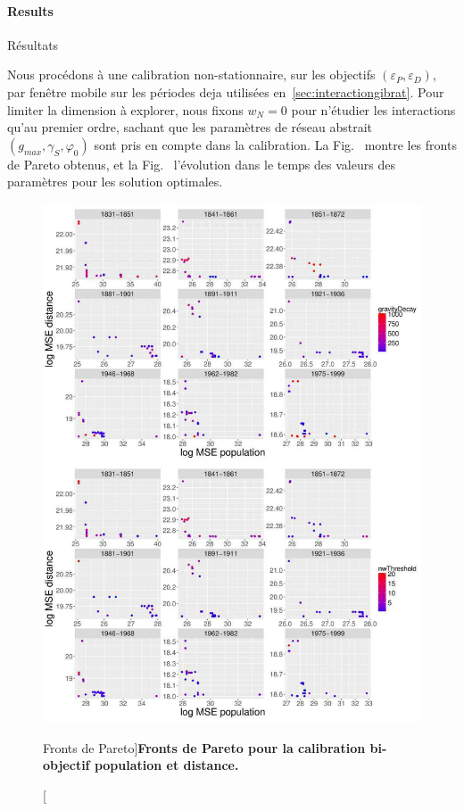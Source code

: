 \paragraph{Results}{Résultats}


Nous procédons à une calibration non-stationnaire, sur les objectifs $(\varepsilon_P,\varepsilon_D)$, par fenêtre mobile sur les périodes deja utilisées en~\ref{sec:interactiongibrat}. Pour limiter la dimension à explorer, nous fixons $w_N = 0$ pour n'étudier les interactions qu'au premier ordre, sachant que les paramètres de réseau abstrait $(g_{max},\gamma_S,\varphi_0)$ sont pris en compte dans la calibration. La Fig.~\label{fig:macrocoevol:pareto} montre les fronts de Pareto obtenus, et la Fig.~\label{fig:macrocoevol:parameters} l'évolution dans le temps des valeurs des paramètres pour les solution optimales.


\begin{figure}
	\includegraphics[width=\linewidth]{Figures/Final/6-2-3-fig-macrocoevol-pareto}
	\caption[Pareto fronts][Fronts de Pareto]{\label{fig:macrocoevol:pareto}}{\textbf{Fronts de Pareto pour la calibration bi-objectif population et distance.}\label{fig:macrocoevol:pareto}}
\end{figure}


